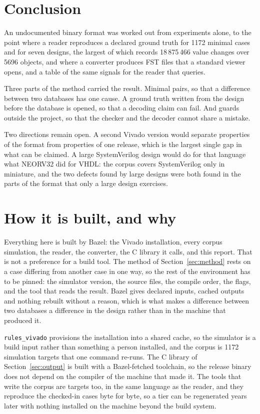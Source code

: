\section{Conclusion}

An undocumented binary format was worked out from experiments alone,
to the point where a reader reproduces a declared ground truth for
1172 minimal cases and for seven designs, the largest of which records
18\,875\,466 value changes over 5696 objects, and where a converter
produces FST files that a standard viewer opens, and a table of the
same signals for the reader that queries.

Three parts of the method carried the result. Minimal pairs, so that a
difference between two databases has one cause. A ground truth written
from the design before the database is opened, so that a decoding
claim can fail. And guards outside the project, so that the checker
and the decoder cannot share a mistake.

Two directions remain open. A second Vivado version would separate
properties of the format from properties of one release, which is the
largest single gap in what can be claimed. A large SystemVerilog
design would do for that language what NEORV32 did for VHDL: the
corpus covers SystemVerilog only in miniature, and the two defects
found by large designs were both found in the parts of the format that
only a large design exercises.

\section*{How it is built, and why}

Everything here is built by Bazel: the Vivado installation, every
corpus simulation, the reader, the converter, the C library it calls,
and this report. That is not a preference for a build tool. The method
of Section~\ref{sec:method} rests on a case differing from another
case in one way, so the rest of the environment has to be pinned:
the simulator version, the source files, the compile order, the flags,
and the tool that reads the result. Bazel gives declared inputs,
cached outputs and nothing rebuilt without a reason, which is what
makes a difference between two databases a difference in the design
rather than in the machine that produced it.

\texttt{rules\_vivado} provisions the installation into a shared
cache, so the simulator is a build input rather than something a
person installed, and the corpus is 1172 simulation targets that one
command re-runs. The C library of Section~\ref{sec:output} is built
with a Bazel-fetched toolchain, so the release binary does not depend
on the compiler of the machine that made it. The tools that write the
corpus are targets too, in the same language as the reader, and they
reproduce the checked-in cases byte for byte, so a tier can be
regenerated years later with nothing installed on the machine beyond
the build system.

